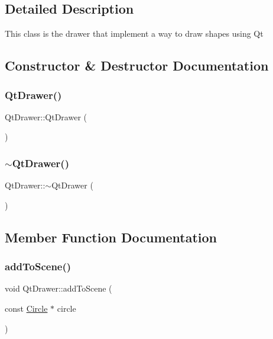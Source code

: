 \subsection{Detailed Description}
This class is the drawer that implement a way to draw shapes using Qt 

\subsection{Constructor \& Destructor Documentation}
\hypertarget{class_qt_drawer_a1d7dce4e986de57aa3dfb7f39052b54e}{}\label{class_qt_drawer_a1d7dce4e986de57aa3dfb7f39052b54e} 
\subsubsection{\texorpdfstring{Qt\+Drawer()}{QtDrawer()}}
{\footnotesize\ttfamily Qt\+Drawer\+::\+Qt\+Drawer (\begin{DoxyParamCaption}{ }\end{DoxyParamCaption})}

\hypertarget{class_qt_drawer_a73b63daa39c4824da08c1486b099a160}{}\label{class_qt_drawer_a73b63daa39c4824da08c1486b099a160} 
\subsubsection{\texorpdfstring{$\sim$\+Qt\+Drawer()}{~QtDrawer()}}
{\footnotesize\ttfamily Qt\+Drawer\+::$\sim$\+Qt\+Drawer (\begin{DoxyParamCaption}{ }\end{DoxyParamCaption})\hspace{0.3cm}{\ttfamily [virtual]}}



\subsection{Member Function Documentation}
\hypertarget{class_qt_drawer_a404a989a5cf6f7b5e7469e251045dacb}{}\label{class_qt_drawer_a404a989a5cf6f7b5e7469e251045dacb} 
\subsubsection{\texorpdfstring{add\+To\+Scene()}{addToScene()}\hspace{0.1cm}{\footnotesize\ttfamily [1/5]}}
{\footnotesize\ttfamily void Qt\+Drawer\+::add\+To\+Scene (\begin{DoxyParamCaption}\item[{const \hyperlink{class_circle}{Circle} $\ast$}]{circle }\end{DoxyParamCaption})}

